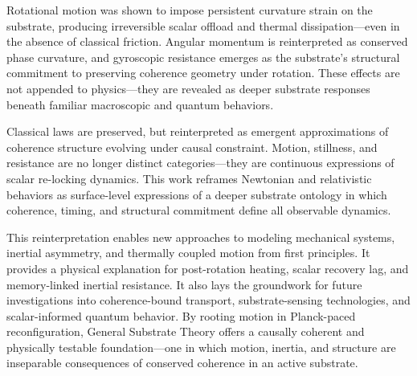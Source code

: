 \documentclass[entropy,article,submit,pdftex,moreauthors]{Definitions/mdpi}
\begin{document}
Rotational motion was shown to impose persistent curvature strain on the substrate, producing irreversible scalar offload and thermal dissipation—even in the absence of classical friction. Angular momentum is reinterpreted as conserved phase curvature, and gyroscopic resistance emerges as the substrate’s structural commitment to preserving coherence geometry under rotation. These effects are not appended to physics—they are revealed as deeper substrate responses beneath familiar macroscopic and quantum behaviors.

Classical laws are preserved, but reinterpreted as emergent approximations of coherence structure evolving under causal constraint. Motion, stillness, and resistance are no longer distinct categories—they are continuous expressions of scalar re-locking dynamics. This work reframes Newtonian and relativistic behaviors as surface-level expressions of a deeper substrate ontology in which coherence, timing, and structural commitment define all observable dynamics.

This reinterpretation enables new approaches to modeling mechanical systems, inertial asymmetry, and thermally coupled motion from first principles. It provides a physical explanation for post-rotation heating, scalar recovery lag, and memory-linked inertial resistance. It also lays the groundwork for future investigations into coherence-bound transport, substrate-sensing technologies, and scalar-informed quantum behavior. By rooting motion in Planck-paced reconfiguration, General Substrate Theory offers a causally coherent and physically testable foundation—one in which motion, inertia, and structure are inseparable consequences of conserved coherence in an active substrate.





\vspace{6pt} 


\end{document}
